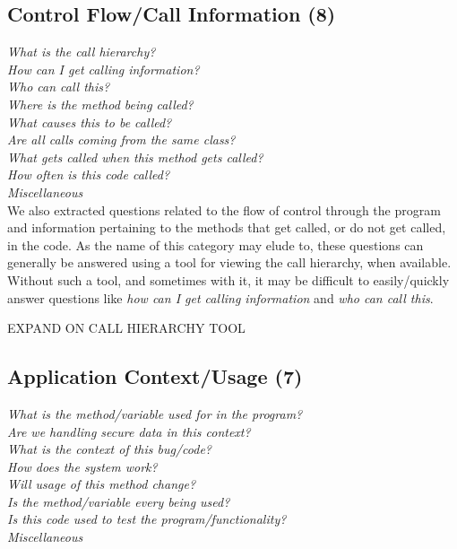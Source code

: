 \documentclass[conference]{IEEEtran}
\begin{document}

\noindent\subsection{\textbf{Control Flow/Call Information (8)}}

\noindent\emph{What is the call hierarchy?} \\
\emph{How can I get calling information?} \\
\emph{Who can call this?} \\
\emph{Where is the method being called?} \\
\emph{What causes this to be called?} \\
\emph{Are all calls coming from the same class?} \\
\emph{What gets called when this method gets called?} \\
\emph{How often is this code called?} \\
\emph{Miscellaneous} \\

We also extracted questions related to the flow of control through the program and information pertaining to the methods that get called, or do not get called, in the code. As the name of this category may elude to, these questions can generally be answered using a tool for viewing the call hierarchy, when available. Without such a tool, and sometimes with it, it may be difficult to easily/quickly answer questions like \emph{how can I get calling information} and \emph{who can call this}.

EXPAND ON CALL HIERARCHY TOOL


\noindent\subsection{\textbf{Application Context/Usage (7)}}

\noindent\emph{What is the method/variable used for in the program?} \\
\emph{Are we handling secure data in this context?} \\
\emph{What is the context of this bug/code?} \\
\emph{How does the system work?} \\
\emph{Will usage of this method change?} \\
\emph{Is the method/variable every being used?} \\
\emph{Is this code used to test the program/functionality?} \\
\emph{Miscellaneous} \\
\end{document}

